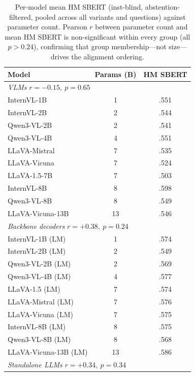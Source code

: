 \begin{table}[ht]
\centering
\small
\setlength{\tabcolsep}{5pt}
\caption{Per-model mean HM SBERT (inst-blind, abstention-filtered, pooled across all variants and questions) against parameter count. Pearson $r$ between parameter count and mean HM SBERT is non-significant within every group (all $p > 0.24$), confirming that group membership---not size---drives the alignment ordering.}
\label{tab:scale_vs_alignment}
\begin{tabular}{lcc}
\toprule
\textbf{Model} & \textbf{Params (B)} & \textbf{HM SBERT} \\
\midrule
\multicolumn{3}{l}{\textit{VLMs} \hfill $r = -0.15,\ p = 0.65$} \\
InternVL-1B       & 1  & .551 \\
InternVL-2B       & 2  & .544 \\
Qwen3-VL-2B       & 2  & .541 \\
Qwen3-VL-4B       & 4  & .551 \\
LLaVA-Mistral     & 7  & .535 \\
LLaVA-Vicuna      & 7  & .524 \\
LLaVA-1.5-7B      & 7  & .503 \\
InternVL-8B       & 8  & .598 \\
Qwen3-VL-8B       & 8  & .549 \\
LLaVA-Vicuna-13B  & 13 & .546 \\
\midrule
\multicolumn{3}{l}{\textit{Backbone decoders} \hfill $r = +0.38,\ p = 0.24$} \\
InternVL-1B (LM)      & 1  & .574 \\
InternVL-2B (LM)      & 2  & .549 \\
Qwen3-VL-2B (LM)      & 2  & .569 \\
Qwen3-VL-4B (LM)      & 4  & .577 \\
LLaVA-1.5 (LM)        & 7  & .574 \\
LLaVA-Mistral (LM)    & 7  & .576 \\
LLaVA-Vicuna (LM)     & 7  & .575 \\
InternVL-8B (LM)      & 8  & .575 \\
Qwen3-VL-8B (LM)      & 8  & .568 \\
LLaVA-Vicuna-13B (LM) & 13 & .586 \\
\midrule
\multicolumn{3}{l}{\textit{Standalone LLMs} \hfill $r = +0.34,\ p = 0.34$} \\

\end{tabular}
\end{table}
